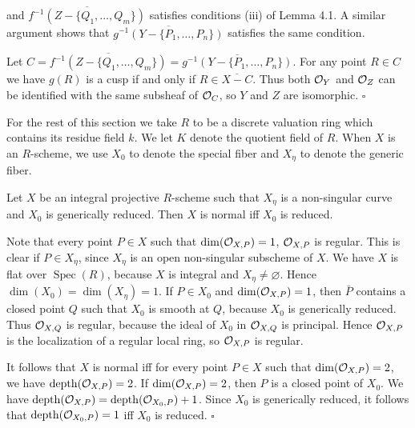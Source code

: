 \documentclass[12pt]{memoir}
\providecommand{\Spec}{\operatorname{Spec}}
\begin{document}
\begin{ptcbp}
and $\overline{f^{-1}(Z - \{Q_1, \dots, Q_m\})}$ satisfies conditions (iii) of Lemma 4.1. A similar argument shows that $\overline{g^{-1}(Y - \{P_1, \dots, P_n\})}$ satisfies the same condition.

Let $C = \overline{f^{-1}(Z - \{Q_1, \dots, Q_m\})} = \overline{g^{-1}(Y - \{P_1, \dots, P_n\})}$. For any point $R \in C$ we have $g(R)$ is a cusp if and only if $R \in \overline{X - C}$. Thus both $\mathcal{O}_Y$ and $\mathcal{O}_Z$ can be identified with the same subsheaf of $\mathcal{O}_C$, so $Y$ and $Z$ are isomorphic. \hfill$\square$
\end{ptcbp}


For the rest of this section we take $R$ to be a discrete valuation ring which contains its residue field $k$. We let $K$ denote the quotient field of $R$. When $X$ is an $R$-scheme, we use $X_0$ to denote the special fiber and $X_\eta$ to denote the generic fiber.

\begin{Lem}\label{lem:4.3}
Let $X$ be an integral projective $R$-scheme such that $X_\eta$ is a non-singular curve and $X_0$ is generically reduced. Then $X$ is normal iff $X_0$ is reduced.
\end{Lem}

\begin{ptcbp}
Note that every point $P \in X$ such that $\dim(\mathcal{O}_{X,P}) = 1$, $\mathcal{O}_{X,P}$ is regular. This is clear if $P \in X_\eta$, since $X_\eta$ is an open non-singular subscheme of $X$. We have $X$ is flat over $\Spec(R)$, because $X$ is integral and $X_\eta \neq \varnothing$. Hence $\dim(X_0) = \dim(X_\eta) = 1$. If $P \in X_0$ and $\dim(\mathcal{O}_{X,P}) = 1$, then $\bar{P}$ contains a closed point $Q$ such that $X_0$ is smooth at $Q$, because $X_0$ is generically reduced. Thus $\mathcal{O}_{X,Q}$ is regular, because the ideal of $X_0$ in $\mathcal{O}_{X,Q}$ is principal. Hence $\mathcal{O}_{X,P}$ is the localization of a regular local ring, so $\mathcal{O}_{X,P}$ is regular.

It follows that $X$ is normal iff for every point $P \in X$ such that $\dim(\mathcal{O}_{X,P}) = 2$, we have $\operatorname{depth}(\mathcal{O}_{X,P}) = 2$. If $\dim(\mathcal{O}_{X,P}) = 2$, then $P$ is a closed point of $X_0$. We have $\operatorname{depth}(\mathcal{O}_{X,P}) = \operatorname{depth}(\mathcal{O}_{X_0,P}) + 1$. Since $X_0$ is generically reduced, it follows that $\operatorname{depth}(\mathcal{O}_{X_0,P}) = 1$ iff $X_0$ is reduced. \hfill$\square$
\end{ptcbp}

\end{document}
